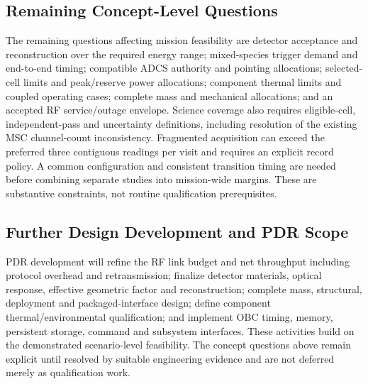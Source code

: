 \subsection{Remaining Concept-Level Questions}\label{sec:open-issues}
The remaining questions affecting mission feasibility are detector acceptance and reconstruction over the required energy range; mixed-species trigger demand and end-to-end timing; compatible ADCS authority and pointing allocations; selected-cell limits and peak/reserve power allocations; component thermal limits and coupled operating cases; complete mass and mechanical allocations; and an accepted RF service/outage envelope. Science coverage also requires eligible-cell, independent-pass and uncertainty definitions, including resolution of the existing MSC channel-count inconsistency. Fragmented acquisition can exceed the preferred three contiguous readings per visit and requires an explicit record policy. A common configuration and consistent transition timing are needed before combining separate studies into mission-wide margins. These are substantive constraints, not routine qualification prerequisites.

\subsection{Further Design Development and PDR Scope}\label{sec:mcr-pdr-scope}
PDR development will refine the RF link budget and net throughput including protocol overhead and retransmission; finalize detector materials, optical response, effective geometric factor and reconstruction; complete mass, structural, deployment and packaged-interface design; define component thermal/environmental qualification; and implement OBC timing, memory, persistent storage, command and subsystem interfaces. These activities build on the demonstrated scenario-level feasibility. The concept questions above remain explicit until resolved by suitable engineering evidence and are not deferred merely as qualification work.
